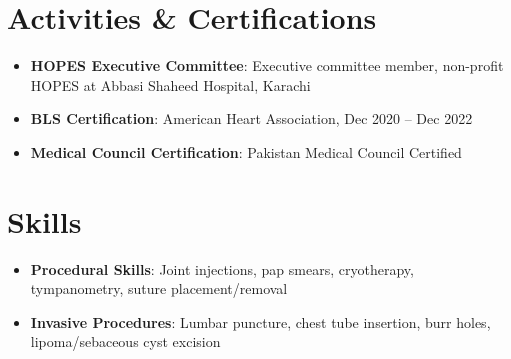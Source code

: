 \documentclass[letterpaper,10pt]{article}
\newcommand{\resumeItem}[2]{
  \item\small{
    \textbf{#1}{: #2 \vspace{-2pt}}
  }
}
\newcommand{\resumeSubHeadingListStart}{\begin{itemize}[leftmargin=*]}
\newcommand{\resumeSubHeadingListEnd}{\end{itemize}}
\newcommand{\resumeItemListStart}{\begin{itemize}}
\newcommand{\resumeItemListEnd}{\end{itemize}\vspace{-5pt}}
\begin{document}
\section{Activities \& Certifications}
  \resumeItemListStart
    \resumeItem{HOPES Executive Committee}{Executive committee member, non-profit HOPES at Abbasi Shaheed Hospital, Karachi}
    \resumeItem{BLS Certification}{American Heart Association, Dec 2020 -- Dec 2022}
    \resumeItem{Medical Council Certification}{Pakistan Medical Council Certified}
  \resumeItemListEnd


\section{Skills}
  \resumeItemListStart
    \resumeItem{Procedural Skills}{Joint injections, pap smears, cryotherapy, tympanometry, suture placement/removal}
    \resumeItem{Invasive Procedures}{Lumbar puncture, chest tube insertion, burr holes, lipoma/sebaceous cyst excision}
  \resumeItemListEnd




\end{document}
